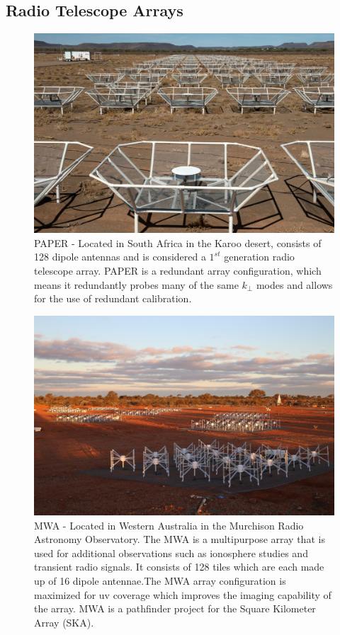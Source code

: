 \documentclass[a0,landscape]{a0poster}
\begin{document}
\begin{multicols}{4}
\section*{Radio Telescope Arrays}
\begin{figure}[H]
\centering
\label{fig:PAPER}
\includegraphics[width=0.8\linewidth]{figures/paper}
\caption{PAPER - Located in South Africa in the Karoo desert, consists of 128 dipole antennas and is considered a $1^{st}$ generation radio telescope array. PAPER is a redundant array configuration, which means it redundantly probes many of the same $k_\perp$ modes and allows for the use of redundant calibration.}
\end{figure}

\begin{figure}[H]
\centering
\label{fig:MWA}
\includegraphics[width=0.8\linewidth]{figures/phaseII_tiles.jpg}
\caption{MWA - Located in Western Australia in the Murchison Radio Astronomy Observatory. The MWA is a multipurpose array that is used for additional observations such as ionosphere studies and transient radio signals. It consists of 128 tiles which are each made up of 16 dipole antennae.The MWA array configuration is maximized for uv coverage which improves the imaging capability of the array. MWA is a pathfinder project for the Square Kilometer Array (SKA).}
\end{figure}


\end{multicols}
\end{document}
